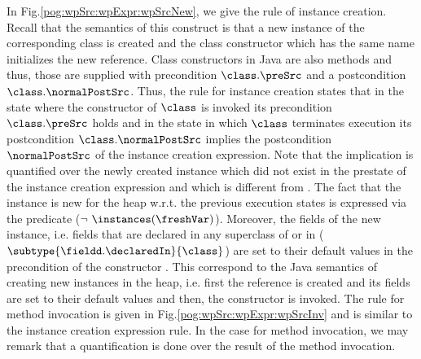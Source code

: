 In Fig.\ref{pog:wpSrc:wpExpr:wpSrcNew}, we give the rule of instance creation.  
Recall that the semantics of this 
construct is that a new instance of the corresponding class \class{} is created and the class constructor
which has the same name initializes the new reference.
Class constructors in Java are also methods 
and thus, those are supplied with  
 precondition $\class.\preSrc$  and a postcondition $\class.\normalPostSrc$.
Thus, the  rule for instance creation states that in the state where the constructor of  $\class$  is invoked 
 its precondition  $\class.\preSrc $ holds and  in the state in which $\class$ 
 terminates execution its postcondition $\class.\normalPostSrc$ implies the postcondition $\normalPostSrc$  of 
the instance creation expression. Note that the implication is quantified over the newly created  instance which did not exist in the prestate
 of the instance creation expression and which is different from \Mynull. The fact that the instance is new for the heap
w.r.t. the previous execution states 
 is expressed  via the  predicate ($\neg \ \instances(\freshVar ) $). 
Moreover, the fields of the new instance, i.e. fields 
that are declared in any superclass of \class{}  or in \class ( $ \subtype{\fieldd.\declaredIn}{  \class} $) are set
 to their default values in the precondition of the constructor \class. This correspond to the Java semantics
of creating new instances in the heap, i.e. first the reference is created and its fields are set to their default values and then,
 the  constructor is invoked.
The rule for method invocation is given in Fig.\ref{pog:wpSrc:wpExpr:wpSrcInv} and is similar to the instance creation expression rule. 
In the case for method invocation, we may remark that a quantification is done over the result of the method invocation.  



